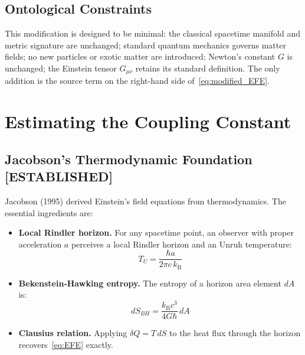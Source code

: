\documentclass[12pt,letterpaper]{article}
\theoremstyle{plain}
\theoremstyle{definition}
\theoremstyle{remark}
\newcommand{\kB}{k_{\mathrm{B}}}
\begin{document}
\subsection{Ontological Constraints}

This modification is designed to be minimal: the classical spacetime
manifold and metric signature are unchanged; standard quantum mechanics
governs matter fields; no new particles or exotic matter are introduced;
Newton's constant $G$ is unchanged; the Einstein tensor $G_{\mu\nu}$
retains its standard definition. The only addition is the source term on
the right-hand side of~\eqref{eq:modified_EFE}.

\section{Estimating the Coupling Constant}
\label{sec:kappa}

\subsection{Jacobson's Thermodynamic Foundation \textcolor{blue!70!black}{[ESTABLISHED]}}

Jacobson (1995) \cite{jacobson1995} derived Einstein's field equations
from thermodynamics. The essential ingredients are:

\begin{itemize}
  \item \textbf{Local Rindler horizon.} For any spacetime point, an
    observer with proper acceleration $a$ perceives a local Rindler
    horizon and an Unruh temperature:
    \begin{equation}
      T_U = \frac{\hbar a}{2\pi c\,\kB}
      \tag{A2.1}
    \end{equation}

  \item \textbf{Bekenstein-Hawking entropy.} The entropy of a horizon
    area element $dA$ is:
    \begin{equation}
      dS_{BH} = \frac{\kB c^3}{4G\hbar}\,dA
      \tag{A2.2}
    \end{equation}

  \item \textbf{Clausius relation.} Applying $\delta Q = T\,dS$ to the
    heat flux through the horizon recovers~\eqref{eq:EFE} exactly.
\end{itemize}
\end{document}
